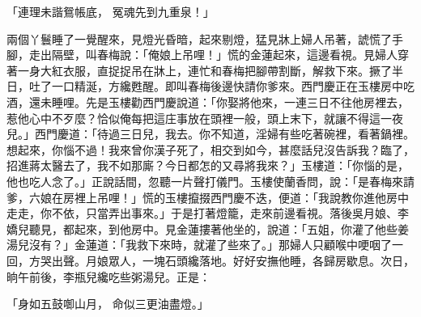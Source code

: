 \begin{showcontents}{}
「連理未諧鴛帳底，  冤魂先到九重泉！」

兩個丫鬟睡了一覺醒來，見燈光昏暗，起來剔燈，猛見牀上婦人吊著，諕慌了手腳，走出隔壁，叫春梅說：「俺娘上吊哩！」慌的金蓮起來，這邊看視。見婦人穿著一身大紅衣服，直捉捉吊在牀上，連忙和春梅把腳帶割斷，解救下來。撅了半日，吐了一口精涎，方纔甦醒。即叫春梅後邊快請你爹來。西門慶正在玉樓房中吃酒，還未睡哩。先是玉樓勸西門慶說道：「你娶將他來，一連三日不往他房裡去，惹他心中不歹麼？恰似俺每把這庄事放在頭裡一般，頭上末下，就讓不得這一夜兒。」西門慶道：「待過三日兒，我去。你不知道，淫婦有些吃著碗裡，看著鍋裡。想起來，你惱不過！我來曾你漢子死了，相交到如今，甚麼話兒沒告訴我？臨了，招進蔣太醫去了，我不如那廝？今日都怎的又尋將我來？」玉樓道：「你惱的是，他也吃人念了。」正說話間，忽聽一片聲打儀門。玉樓使蘭香問，說：「是春梅來請爹，六娘在房裡上吊哩！」慌的玉樓攛掇西門慶不迭，便道：「我說教你進他房中走走，你不依，只當弄出事來。」于是打著燈籠，走來前邊看視。落後吳月娘、李嬌兒聽見，都起來，到他房中。見金蓮摟著他坐的，說道：「五姐，你灌了他些姜湯兒沒有？」金蓮道：「我救下來時，就灌了些來了。」那婦人只顧喉中哽咽了一回，方哭出聲。月娘眾人，一塊石頭纔落地。好好安撫他睡，各歸房歇息。次日，晌午前後，李瓶兒纔吃些粥湯兒。正是：

「身如五鼓啣山月，  命似三更油盡燈。」


\end{showcontents}
